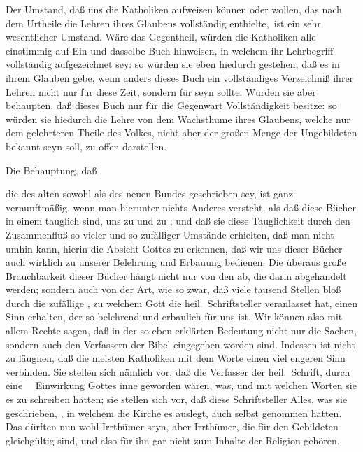\begin{aufza}
\item Der Umstand, daß uns die Katholiken  aufweisen können oder wollen, das nach dem Urtheile  die Lehren ihres Glaubens vollständig enthielte,~ist ein sehr wesentlicher Umstand. Wäre das Gegentheil, würden die Katholiken alle einstimmig auf Ein und dasselbe Buch hinweisen, in welchem ihr Lehrbegriff vollständig aufgezeichnet sey: so würden sie eben hiedurch gestehen, daß es  in ihrem Glauben gebe, wenn anders dieses Buch ein vollständiges Verzeichniß ihrer Lehren nicht nur für diese Zeit, sondern für  seyn sollte. Würden sie aber behaupten, daß dieses Buch nur für die Gegenwart Vollständigkeit besitze: so würden sie hiedurch die Lehre von dem Wachsthume ihres Glaubens, welche nur dem gelehrteren Theile des Volkes, nicht aber der großen Menge der Ungebildeten bekannt seyn soll, zu offen darstellen.
\item Die Behauptung, daß
\begin{aufzb}
\item die  des alten sowohl als des neuen Bundes  geschrieben sey, ist ganz vernunftmäßig, wenn man hierunter nichts Anderes versteht, als daß diese Bücher in einem  tauglich sind, uns zu  und zu ; und daß sie diese Tauglichkeit durch den Zusammenfluß so vieler und so zufälliger Umstände erhielten, daß man nicht umhin kann, hierin die Absicht Gottes zu erkennen, daß wir uns dieser Bücher auch wirklich zu unserer Belehrung und Erbauung bedienen. Die überaus große Brauchbarkeit dieser Bücher hängt nicht nur von den  ab, die darin abgehandelt werden; sondern auch von der Art, wie  so zwar, daß viele tausend Stellen bloß durch die zufällige , zu welchem Gott die heil.\ Schriftsteller veranlasset hat, einen Sinn erhalten, der so belehrend und erbaulich für uns ist. Wir können also mit allem Rechte sagen, daß in der so eben erklärten Bedeutung nicht nur die Sachen, sondern auch  den Verfassern der Bibel eingegeben worden sind. Indessen ist nicht zu läugnen, daß die meisten Katholiken mit dem Worte  einen viel engeren Sinn verbinden. Sie stellen sich nämlich vor, daß die Verfasser der heil.\ Schrift,  durch eine~\  Einwirkung Gottes inne geworden wären, was, und mit welchen Worten sie es zu schreiben hätten; sie stellen sich vor, daß diese Schriftsteller Alles, was sie geschrieben, , in welchem die Kirche es auslegt, auch selbst genommen hätten. Das dürften nun wohl Irrthümer seyn, aber Irrthümer, die für den Gebildeten gleichgültig sind, und also für ihn gar nicht zum Inhalte der Religion gehören.

\end{aufzb}
\end{aufza}
